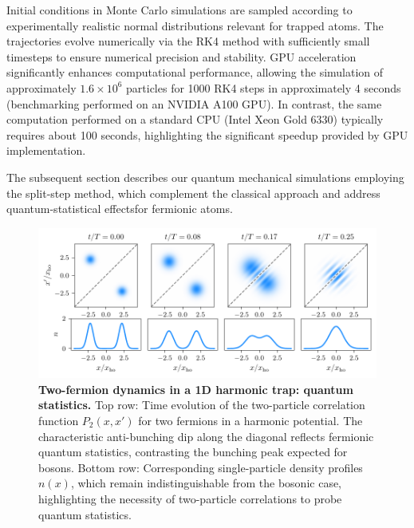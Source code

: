 Initial conditions in Monte Carlo simulations are sampled according to experimentally realistic normal distributions relevant for trapped atoms. The trajectories evolve numerically via the RK4 method with sufficiently small timesteps to ensure numerical precision and stability. GPU acceleration significantly enhances computational performance, allowing the simulation of approximately $1.6 \times 10^6$ particles for 1000 RK4 steps in approximately 4 seconds (benchmarking performed on an NVIDIA A100 GPU). In contrast, the same computation performed on a standard CPU (Intel Xeon Gold 6330) typically requires about 100 seconds, highlighting the significant speedup provided by GPU implementation. 

The subsequent section describes our quantum mechanical simulations employing the split-step method, which complement the classical approach and address quantum-statistical effectsfor fermionic atoms.



\begin{figure}
    \centering
    \includegraphics{fig-py/interference.pdf}
    \caption[Two-fermion dynamics in a 1D harmonic trap: quantum statistics]{
        \textbf{Two-fermion dynamics in a 1D harmonic trap: quantum statistics.}
        Top row: Time evolution of the two-particle correlation function $P_2(x,x')$ for two fermions in a harmonic potential. The characteristic anti-bunching dip along the diagonal reflects fermionic quantum statistics, contrasting the bunching peak expected for bosons. Bottom row: Corresponding single-particle density profiles $n(x)$, which remain indistinguishable from the bosonic case, highlighting the necessity of two-particle correlations to probe quantum statistics.
        }
    \label{fig:interference}
\end{figure}



